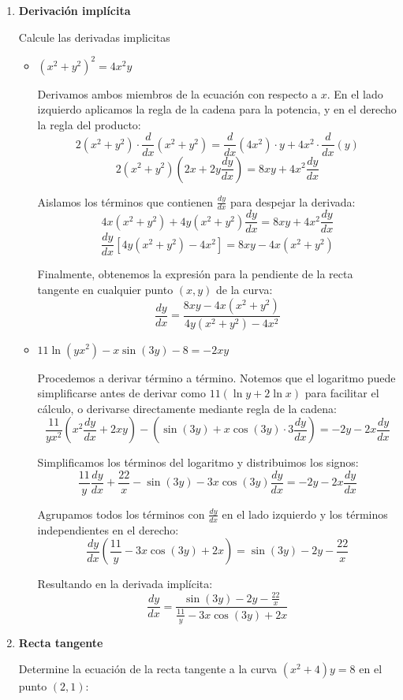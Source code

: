 \documentclass[12pt]{article}
\begin{document}
{\begin{enumerate}
\item \textbf{Derivación implícita}

Calcule las derivadas implicitas 
\begin{itemize}
    \item[(a)] $(x^2+y^2)^2=4x^2y$
    
    Derivamos ambos miembros de la ecuación con respecto a $x$. En el lado izquierdo aplicamos la regla de la cadena para la potencia, y en el derecho la regla del producto:
    \[ 2(x^2+y^2) \cdot \frac{d}{dx}(x^2+y^2) = \frac{d}{dx}(4x^2) \cdot y + 4x^2 \cdot \frac{d}{dx}(y) \]
    \[ 2(x^2+y^2) \left( 2x + 2y \frac{dy}{dx} \right) = 8xy + 4x^2 \frac{dy}{dx} \]
    
    Aislamos los términos que contienen $\frac{dy}{dx}$ para despejar la derivada:
    \[ 4x(x^2+y^2) + 4y(x^2+y^2)\frac{dy}{dx} = 8xy + 4x^2\frac{dy}{dx} \]
    \[ \frac{dy}{dx} \left[ 4y(x^2+y^2) - 4x^2 \right] = 8xy - 4x(x^2+y^2) \]
    
    Finalmente, obtenemos la expresión para la pendiente de la recta tangente en cualquier punto $(x, y)$ de la curva:
    \[ \frac{dy}{dx} = \frac{8xy - 4x(x^2+y^2)}{4y(x^2+y^2) - 4x^2} \]

    \item[(b)] $11\ln(yx^2)-x\sin(3y)-8=-2xy$
    
    Procedemos a derivar término a término. Notemos que el logaritmo puede simplificarse antes de derivar como $11(\ln y + 2\ln x)$ para facilitar el cálculo, o derivarse directamente mediante regla de la cadena:
    \[ \frac{11}{yx^2} \left( x^2 \frac{dy}{dx} + 2xy \right) - \left( \sin(3y) + x\cos(3y) \cdot 3 \frac{dy}{dx} \right) = -2y - 2x \frac{dy}{dx} \]
    
    Simplificamos los términos del logaritmo y distribuimos los signos:
    \[ \frac{11}{y}\frac{dy}{dx} + \frac{22}{x} - \sin(3y) - 3x\cos(3y)\frac{dy}{dx} = -2y - 2x\frac{dy}{dx} \]
    
    Agrupamos todos los términos con $\frac{dy}{dx}$ en el lado izquierdo y los términos independientes en el derecho:
    \[ \frac{dy}{dx} \left( \frac{11}{y} - 3x\cos(3y) + 2x \right) = \sin(3y) - 2y - \frac{22}{x} \]
    
    Resultando en la derivada implícita:
    \[ \frac{dy}{dx} = \frac{\sin(3y) - 2y - \frac{22}{x}}{\frac{11}{y} - 3x\cos(3y) + 2x} \]
\end{itemize}
\item \textbf{Recta tangente}

Determine la ecuación de la recta tangente a la curva $(x^2+4)y=8$ en el punto $(2,1)$:


\end{enumerate}}
\end{document}
